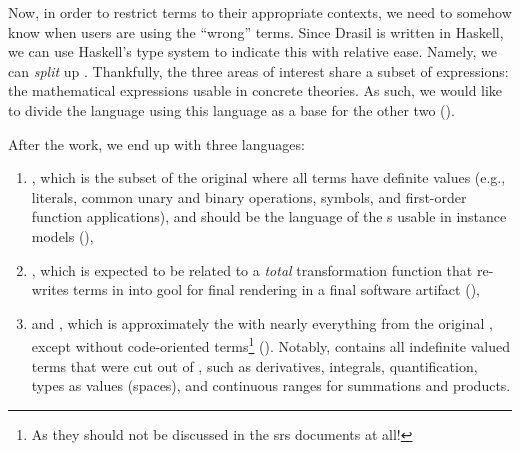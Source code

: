 Now, in order to restrict terms to their appropriate contexts, we need to
somehow know when users are using the ``wrong'' terms. Since Drasil is written
in Haskell, we can use Haskell's type system to indicate this with relative
ease. Namely, we can \textit{split} up \Expr{}. Thankfully, the three areas of
interest share a subset of expressions: the mathematical expressions usable in
concrete theories. As such, we would like to divide the language using this
language as a base for the other two ().

\languageDivision{}

After the work, we end up with three languages:

\begin{enumerate}

    \item \Expr{}, which is the subset of the original \Expr{} where all terms
          have definite values (e.g., literals, common unary and binary
          operations, symbols, and first-order function applications), and
          should be the language of the \QDefinition{}s usable in instance
          models (),
    
    \item \CodeExpr{}, which is expected to be related to a \textit{total}
          transformation function that re-writes terms in \CodeExpr{} into
          \acs{gool} for final rendering in a final software artifact
          (),

    \item and \ModelExpr{}, which is approximately the \Expr{} with nearly
          everything from the original \Expr{}, except without code-oriented
          terms\footnote{As they should not be discussed in the \acs{srs}
          documents at all!} (). Notably,
          \ModelExpr{} contains all indefinite valued terms that were cut out of
          \Expr{}, such as derivatives, integrals, quantification, types as
          values (spaces), and continuous ranges for summations and products.

\end{enumerate}

